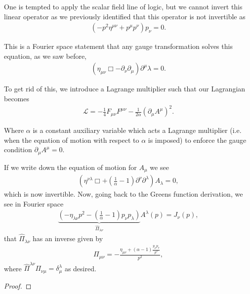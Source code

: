 One is tempted to apply the scalar field line of logic, but we cannot invert this linear operator as we previously identified that this operator is not invertible as
\begin{align}
    \left( -p^2 \eta^{\mu \nu} + p^{\mu} p^{\nu} \right) p_\nu = 0
.\end{align}

This is a Fourier space statement that any gauge transformation solves this equation, as we saw before,
\begin{align}
    \left( \eta_{\mu \nu} \Box - \partial_\nu \partial_\mu \right) \partial^{\mu} \lambda = 0
.\end{align}

To get rid of this, we introduce a Lagrange multiplier such that our Lagrangian becomes
\begin{align}
    \mathcal{L} = -\frac{1}{4} F_{\mu \nu} F^{\mu \nu} - \frac{1}{2\alpha} \left( \partial_\mu A^{\mu} \right)^2
.\end{align}

Where $\alpha$ is a constant auxiliary variable which acts a Lagrange multiplier (i.e. when the equation of motion with respect to $\alpha$ is imposed) to enforce the gauge condition $\partial_\mu A^{\mu} = 0$.

If we write down the equation of motion for $A_{\mu}$ we see
\begin{align}
    \left( \eta^{\nu \lambda} \Box + \left( \frac{1}{\alpha} - 1 \right) \partial^{\nu} \partial^{\lambda} \right) A_\lambda = 0
,\end{align}
which is now invertible. Now, going back to the Greens function derivation, we see in Fourier space
\begin{align}
    \underbrace{\left( -\eta_{\lambda \nu} p^2 - \left( \frac{1}{\alpha} - 1 \right) p_\nu p_\lambda \right)}_{\hat{\Pi}_{\lambda \nu}} A^{\lambda} \left( p \right) = J_\nu \left( p \right) 
,\end{align}
that $\hat{\Pi}_{\lambda \nu}$ has an inverse given by
\begin{align}
    \Pi_{\mu \nu} = - \frac{\eta_{\mu \nu} + \left( \alpha - 1 \right) \frac{p_\mu p_\nu}{p^2}}{p^2}
,\end{align}
where $\hat{\Pi}^{\lambda \nu} \Pi_{\nu \mu} = \delta^{\lambda}_{\mu}$ as desired.

\begin{proof}
    
\end{proof}




